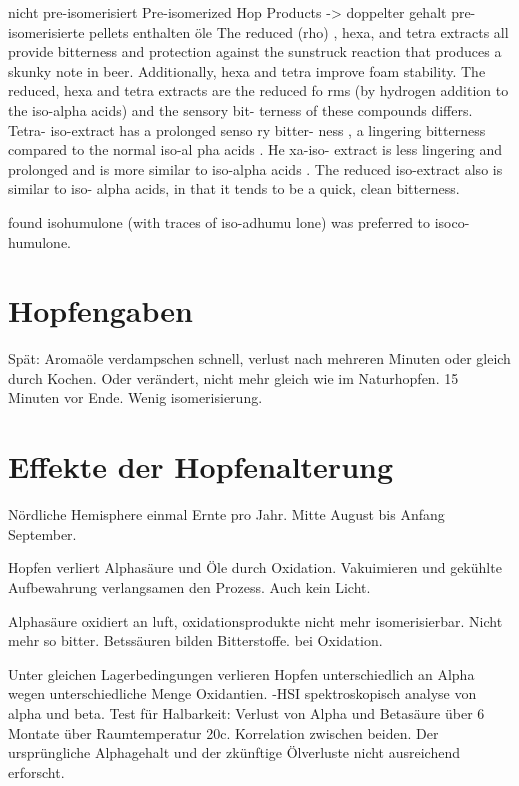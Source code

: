 \documentclass[a4paper,parskip=half]{scrartcl}
\begin{document}
\parencite[52]{Davidson1997}
nicht pre-isomerisiert
Pre-isomerized Hop Products -> doppelter gehalt
pre-isomerisierte pellets enthalten öle
The reduced (rho) , hexa, and tetra extracts
all provide bitterness and protection against
the sunstruck reaction that produces a
skunky note in beer. Additionally, hexa and
tetra improve foam stability.
The
reduced, hexa and tetra extracts are the
reduced fo rms (by hydrogen addition to
the iso-alpha acids) and the sensory bit-
terness of these compounds differs. Tetra-
iso-extract has a prolonged senso ry bitter-
ness , a lingering bitterness compared to
the normal iso-al pha acids . He xa-iso-
extract is less lingering and prolonged and
is more similar to iso-alpha acids . The
reduced iso-extract also is similar to iso-
alpha acids, in that it tends to be a quick,
clean bitterness.

found isohumulone (with traces of
iso-adhumu lone) was preferred to isoco-
humulone.

\section*{Hopfengaben}

\parencite[15]{Garetz1994}
Spät: Aromaöle verdampschen schnell, verlust nach mehreren Minuten
oder gleich durch Kochen. Oder verändert, nicht mehr gleich
wie im Naturhopfen. 15 Minuten vor Ende. Wenig isomerisierung.

\section*{Effekte der Hopfenalterung}

Nördliche Hemisphere einmal Ernte pro Jahr. Mitte August bis
Anfang September.
\parencite[97]{Garetz1994}

\parencite[97]{Garetz1994} Hopfen verliert Alphasäure und Öle
durch Oxidation. Vakuimieren und gekühlte Aufbewahrung verlangsamen
den Prozess. Auch kein Licht. 

\parencite[103]{Garetz1994} Alphasäure oxidiert an luft, oxidationsprodukte
nicht mehr isomerisierbar. Nicht mehr so bitter. Betssäuren bilden
Bitterstoffe. bei Oxidation.

\parencite[104]{Garetz1994} 
Unter gleichen Lagerbedingungen verlieren Hopfen unterschiedlich an
Alpha wegen unterschiedliche Menge Oxidantien.
-HSI spektroskopisch analyse von alpha und beta. Test für Halbarkeit:
Verlust von Alpha und Betasäure über 6 Montate über Raumtemperatur 20c.
Korrelation zwischen beiden. Der ursprüngliche Alphagehalt und der
zkünftige
Ölverluste nicht ausreichend erforscht.
\end{document}

